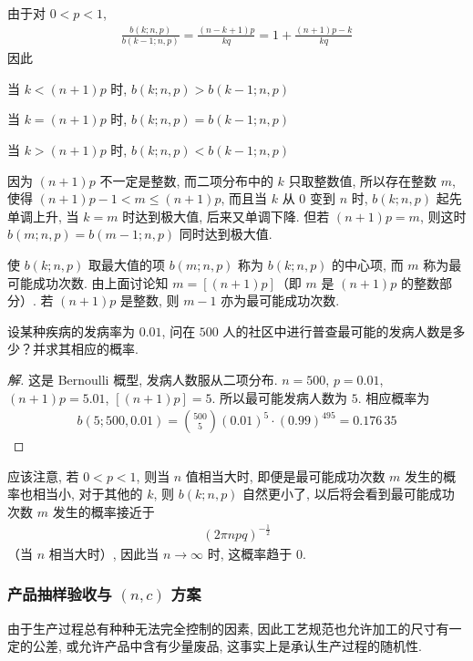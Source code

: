 \documentclass[../../main.tex]{subfiles}
\begin{document}
由于对 $0<p<1$,
\begin{align*}
\frac{b(k;n,p)}{b(k-1;n,p)}=\frac{(n-k+1)p}{kq}=1+\frac{(n+1)p-k}{kq}
\end{align*}
因此

当 $k<(n+1)p$ 时, $b(k;n,p)>b(k-1;n,p)$

当 $k=(n+1)p$ 时, $b(k;n,p)=b(k-1;n,p)$

当 $k>(n+1)p$ 时, $b(k;n,p)<b(k-1;n,p)$

因为 $(n+1)p$ 不一定是整数, 而二项分布中的 $k$ 只取整数值, 所以存在整数 $m$, 使得 $(n+1)p-1<m\leqslant (n+1)p$, 而且当 $k$ 从 $0$ 变到 $n$ 时, $b(k;n,p)$ 起先单调上升, 当 $k=m$ 时达到极大值, 后来又单调下降. 但若 $(n+1)p=m$, 则这时 $b(m;n,p)=b(m-1;n,p)$ 同时达到极大值.

使 $b(k;n,p)$ 取最大值的项 $b(m;n,p)$ 称为 $b(k;n,p)$ 的中心项, 而 $m$ 称为最可能成功次数. 由上面讨论知 $m=[(n+1)p]$（即 $m$ 是 $(n+1)p$ 的整数部分）. 若 $(n+1)p$ 是整数, 则 $m-1$ 亦为最可能成功次数.

\begin{example}[疾病普查中最可能的发病人数]\label{example:ch02-疾病普查最可能发病人数}
设某种疾病的发病率为 $0.01$, 问在 $500$ 人的社区中进行普查最可能的发病人数是多少？并求其相应的概率.

\begin{proof}[解]
这是 Bernoulli 概型, 发病人数服从二项分布. $n=500$, $p=0.01$, $(n+1)p=5.01$, $[(n+1)p]=5$. 所以最可能发病人数为 $5$. 相应概率为
\begin{align}\label{align:ch02-最可能发病人数概率}
b(5;500,0.01)=\binom{500}{5}(0.01)^5\cdot(0.99)^{495}=0.176\,35
\end{align}
\end{proof}

应该注意, 若 $0<p<1$, 则当 $n$ 值相当大时, 即便是最可能成功次数 $m$ 发生的概率也相当小, 对于其他的 $k$, 则 $b(k;n,p)$ 自然更小了, 以后将会看到最可能成功次数 $m$ 发生的概率接近于
\begin{align*}
(2\pi npq)^{-\frac{1}{2}}
\end{align*}
（当 $n$ 相当大时）, 因此当 $n\to\infty$ 时, 这概率趋于 $0$.
\end{example}

\subsubsection{产品抽样验收与 $(n,c)$ 方案}

由于生产过程总有种种无法完全控制的因素, 因此工艺规范也允许加工的尺寸有一定的公差, 或允许产品中含有少量废品, 这事实上是承认生产过程的随机性.
\end{document}
